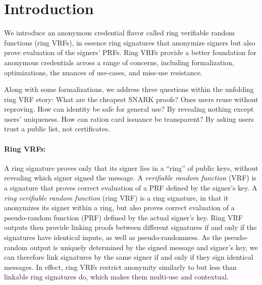 \section{Introduction}

\def\qaudbreak{\eprint{\quad}{\\}}


We introduce an anonymous credential flavor called
ring verifiable random functions (ring VRFs),
in essence ring signatures that anonymize signers but
also prove evaluation of the signers' PRFs.
Ring VRFs provide a better foundation for anonymous credentials
across a range of concerns, including formalization, optimizations,
the nuances of use-cases, and miss-use resistance.

Along with some formalizations, we address three questions within
the unfolding ring VRF story:
What are the cheapest SNARK proofs?  Ones users reuse without reproving.
How can identity be safe for general use?  By revealing nothing except users' uniqueness.
How can ration card issuance be transparent?  By asking users trust a public list, not certificates.



\paragraph{Ring VRFs:}

A ring signature \cite{ring_accountable,ring_efficient,ring_linkable,ring_noRO,ring_sublinear} proves only that its  signer lies in a ``ring''
of public keys, without revealing which signer  signed the message.
A {\it verifiable random function} (VRF) is a signature that proves
correct evaluation of a PRF defined by the signer's key.
A {\it ring verifiable random function} (ring VRF) is a ring signature, in
that it anonymizes its  signer within a ring,
but also proves correct evaluation of a pseudo-random function (PRF)
defined by the actual signer's key. %
%
Ring VRF outputs then provide linking proofs between different signatures
if and only if  the signatures have identical inputs, as well as pseudo-randomness.
As the pseudo-random output is uniquely determined by the signed message
and signer's  key, we can therefore link signatures by the
same signer if and only if they sign identical messages.
In effect, ring VRFs restrict anonymity similarly to but less than
linkable ring signatures \cite{ring_linkable,ring_linkablee}  do, which makes them multi-use and contextual.

